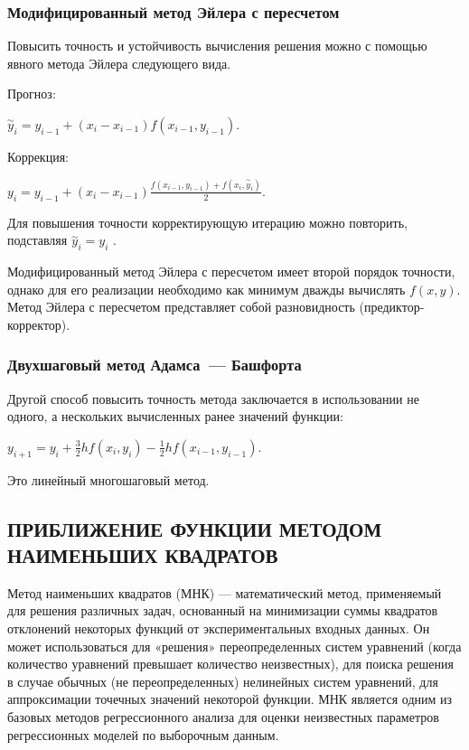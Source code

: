 \documentclass[a4paper]{article}
\begin{document}
{{{{{{{{\subsubsection{Модифицированный метод Эйлера с пересчетом}

Повысить точность и устойчивость вычисления решения можно с помощью
явного метода Эйлера следующего вида.

Прогноз:
\begin{center}
 {{\({\overset{\sim}{y}}_{i} = y_{i - 1} + (x_{i} - x_{i - 1})f(x_{i - 1},y_{i - 1})\)}}.
\end{center}

Коррекция:

\begin{center}
 {{\(y_{i} = y_{i - 1} + (x_{i} - x_{i - 1})\frac{f(x_{i - 1},y_{i - 1}) + f(x_{i},{\overset{\sim}{y}}_{i})}{2}\)}}.
\end{center}


Для повышения точности корректирующую итерацию можно повторить,
подставляя {{\({\overset{\sim}{y}}_{i} = y_{i}\)}} .

Модифицированный метод Эйлера с пересчетом имеет второй порядок
точности, однако для его реализации необходимо как минимум дважды
вычислять {{\(f(x,y)\)}}. Метод Эйлера с пересчетом представляет собой
разновидность (предиктор-корректор).

\subsubsection{Двухшаговый метод Адамса~--- Башфорта}

Другой способ повысить точность метода заключается в использовании не
одного, а нескольких вычисленных ранее значений функции:

\begin{center}
 {{\(y_{i + 1} = y_{i} + \frac{3}{2}hf(x_{i},y_{i}) - \frac{1}{2}hf(x_{i - 1},y_{i - 1}).\)}}
\end{center}

Это линейный многошаговый метод.

\newpage

\begin{center}
 \section{ПРИБЛИЖЕНИЕ ФУНКЦИИ МЕТОДОМ НАИМЕНЬШИХ КВАДРАТОВ}
\end{center}

Метод наименьших квадратов (МНК) — математический метод, применяемый для решения различных задач, основанный на минимизации суммы квадратов отклонений некоторых функций от экспериментальных входных данных. Он может использоваться для «решения» переопределенных систем уравнений (когда количество уравнений превышает количество неизвестных), для поиска решения в случае обычных (не переопределенных) нелинейных систем уравнений, для аппроксимации точечных значений некоторой функции. МНК является одним из базовых методов регрессионного анализа для оценки неизвестных параметров регрессионных моделей по выборочным данным.

}}}}}}}}
\end{document}
